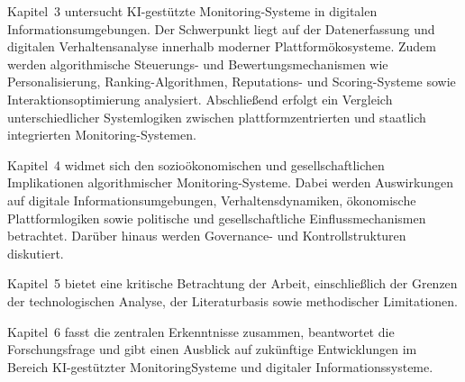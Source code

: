 Kapitel~3 untersucht \ac{KI}-gestützte Monitoring-Systeme in digitalen Informationsumgebungen. Der Schwerpunkt liegt auf der Datenerfassung und digitalen Verhaltensanalyse innerhalb moderner Plattformökosysteme. Zudem werden algorithmische Steuerungs- und Bewertungsmechanismen wie Personalisierung, Ranking-Algorithmen, Reputations- und Scoring-Systeme sowie Interaktionsoptimierung analysiert. Abschließend erfolgt ein Vergleich unterschiedlicher Systemlogiken zwischen plattformzentrierten und staatlich integrierten Monitoring-Systemen.

Kapitel~4 widmet sich den sozioökonomischen und gesellschaftlichen Implikationen algorithmischer Monitoring-Systeme. Dabei werden Auswirkungen auf digitale Informationsumgebungen, Verhaltensdynamiken, ökonomische Plattformlogiken sowie politische und gesellschaftliche Einflussmechanismen betrachtet. Darüber hinaus werden Governance- und Kontrollstrukturen diskutiert.

Kapitel~5 bietet eine kritische Betrachtung der Arbeit, einschließlich der Grenzen der technologischen Analyse, der Literaturbasis sowie methodischer Limitationen.

Kapitel~6 fasst die zentralen Erkenntnisse zusammen, beantwortet die Forschungsfrage und
gibt einen Ausblick auf zukünftige Entwicklungen im Bereich \ac{KI}-gestützter MonitoringSysteme und digitaler Informationssysteme.
